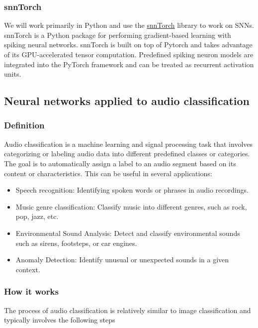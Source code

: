 \documentclass[11pt]{article}
\begin{document}
\subsubsection{snnTorch}
We will work primarily in Python and use the \hyperref[item:snntorch-lib]{snnTorch} library to work on SNNs. snnTorch is a Python package for performing gradient-based learning with spiking neural networks. snnTorch is built on top of Pytorch and takes advantage of its GPU-accelerated tensor computation. Predefined spiking neuron models are integrated into the PyTorch framework and can be treated as recurrent activation units.


\subsection{Neural networks applied to audio classification}
\subsubsection{Definition}
Audio classification is a machine learning and signal processing task that involves categorizing or labeling audio data into different predefined classes or categories. The goal is to automatically assign a label to an audio segment based on its content or characteristics. This can be useful in several applications:

\begin{itemize}
  \item Speech recognition: Identifying spoken words or phrases in audio recordings.
  \item Music genre classification: Classify music into different genres, such as rock, pop, jazz, etc.
  \item Environmental Sound Analysis: Detect and classify environmental sounds such as sirens, footsteps, or car engines.
  \item Anomaly Detection: Identify unusual or unexpected sounds in a given context.
\end{itemize}

\subsubsection{How it works}

The process of audio classification is relatively similar to image classification and typically involves the following steps
\end{document}
